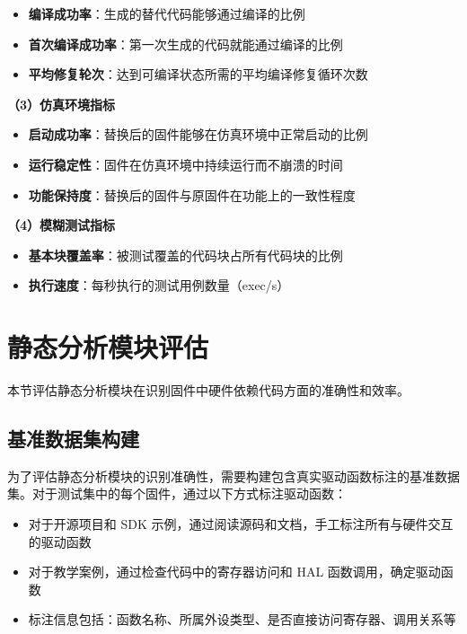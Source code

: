 \begin{itemize}
    \item \textbf{编译成功率}：生成的替代代码能够通过编译的比例
    \item \textbf{首次编译成功率}：第一次生成的代码就能通过编译的比例
    \item \textbf{平均修复轮次}：达到可编译状态所需的平均编译修复循环次数
\end{itemize}

\textbf{（3）仿真环境指标}

\begin{itemize}
    \item \textbf{启动成功率}：替换后的固件能够在仿真环境中正常启动的比例
    \item \textbf{运行稳定性}：固件在仿真环境中持续运行而不崩溃的时间
    \item \textbf{功能保持度}：替换后的固件与原固件在功能上的一致性程度
\end{itemize}

\textbf{（4）模糊测试指标}

\begin{itemize}
    \item \textbf{基本块覆盖率}：被测试覆盖的代码块占所有代码块的比例
    \item \textbf{执行速度}：每秒执行的测试用例数量（exec/s）
\end{itemize}

\section{静态分析模块评估}
\label{sec:eval_static}

本节评估静态分析模块在识别固件中硬件依赖代码方面的准确性和效率。

\subsection{基准数据集构建}

为了评估静态分析模块的识别准确性，需要构建包含真实驱动函数标注的基准数据集。对于测试集中的每个固件，通过以下方式标注驱动函数：

\begin{itemize}
    \item 对于开源项目和 SDK 示例，通过阅读源码和文档，手工标注所有与硬件交互的驱动函数
    \item 对于教学案例，通过检查代码中的寄存器访问和 HAL 函数调用，确定驱动函数
    \item 标注信息包括：函数名称、所属外设类型、是否直接访问寄存器、调用关系等
\end{itemize}

